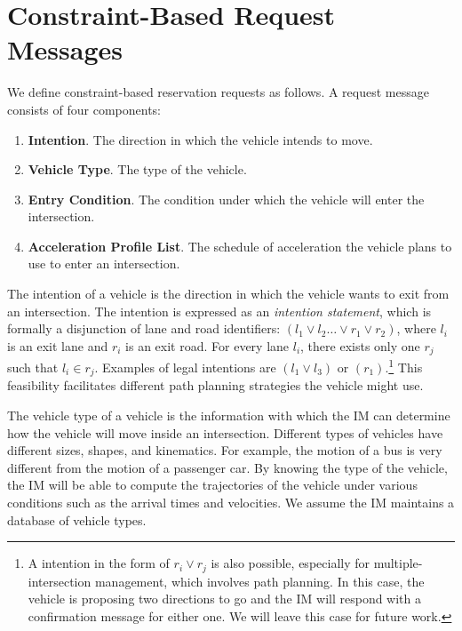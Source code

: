 \section{Constraint-Based Request Messages}
\label{sec:request}

We define constraint-based reservation requests as follows.
A request message consists of four components:
\begin{enumerate}
\item{\bf Intention}. The direction in which the vehicle intends to
  move.
\item{\bf Vehicle Type}. The type of the vehicle.
\item{\bf Entry Condition}. The condition under which the vehicle
  will enter the intersection.
\item{\bf Acceleration Profile List}. The schedule of acceleration
  the vehicle plans to use to enter an intersection.
\end{enumerate}

The intention of a vehicle is the direction in which the vehicle wants
to exit from an intersection.  The intention is expressed as an
\emph{intention statement}, which is formally a disjunction of lane
and road identifiers: $(l_1 \vee l_2 \ldots \vee r_1 \vee r_2)$, where
$l_i$ is an exit lane and $r_i$ is an exit road. For every lane $l_i$,
there exists only one $r_j$ such that $l_i \in r_j$. 
Examples of legal intentions are $(l_1 \vee l_3)$ or
$(r_1)$.\footnote{A intention in the form of $r_i \vee r_j$ is also possible,
especially for multiple-intersection management, which involves path
planning. In this case, the vehicle is proposing two directions to go
and the IM will respond with a confirmation message for either one. We
will leave this case for future work.}
This feasibility facilitates different path planning strategies the
vehicle might use.

The vehicle type of a vehicle is the information with which the IM can
determine how the vehicle will move inside an intersection.  Different
types of vehicles have different sizes, shapes, and kinematics.  For
example, the motion of a bus is very different from the motion of a
passenger car.  By knowing the type of the vehicle, the IM will be
able to compute the trajectories of the vehicle under various conditions
such as the arrival times and velocities. We assume the IM maintains
a database of vehicle types.

